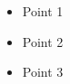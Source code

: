 \documentclass{beamer}
\begin{document}
\begin{frame}
    \vspace{2cm} %
    \begin{itemize}
        \item Point 1
        \item Point 2
        \item Point 3
    \end{itemize}
\end{frame}
\end{document}
